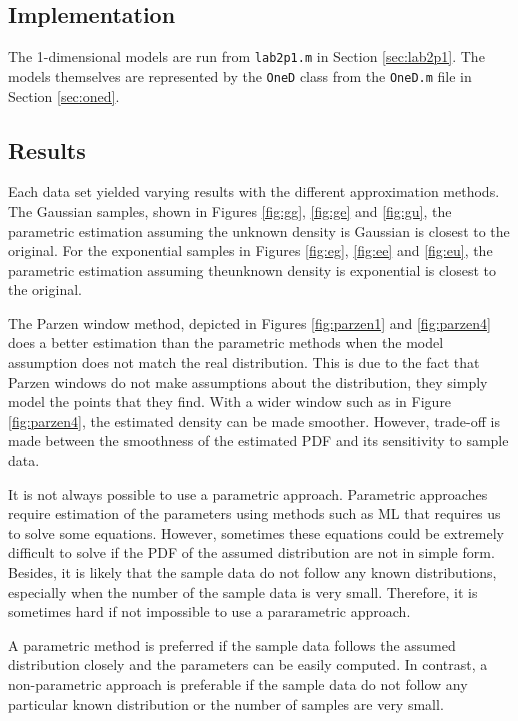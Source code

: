 \label{sec:1d}
\subsection{Implementation}
The 1-dimensional models are run from \texttt{lab2p1.m} in Section
\ref{sec:lab2p1}. The models themselves are represented by the \texttt{OneD}
class from the \texttt{OneD.m} file in Section \ref{sec:oned}.

\subsection{Results}
Each data set yielded varying results with the different approximation methods.
The Gaussian samples, shown in Figures \ref{fig:gg}, \ref{fig:ge} and
\ref{fig:gu}, the parametric estimation assuming the unknown density is
Gaussian is closest to the original. For the exponential samples in Figures
\ref{fig:eg}, \ref{fig:ee} and \ref{fig:eu}, the
parametric estimation assuming theunknown density is exponential is closest to
the original.

The Parzen window method, depicted in Figures \ref{fig:parzen1} and \ref{fig:parzen4} does a
better estimation than the parametric methods when the model assumption does
not match the real distribution. This is due to the fact that Parzen windows do
not make assumptions about the distribution, they simply model the points that
they find. With a wider window such as in Figure \ref{fig:parzen4}, the estimated density
can be made smoother. However, trade-off is made between the smoothness of the estimated PDF and its
sensitivity to sample data.

It is not always possible to use a parametric approach. Parametric
approaches require estimation of the parameters using methods such as ML that
requires us to solve some equations. However, sometimes these equations could
be extremely difficult to solve if the PDF of the assumed distribution are not
in simple form. Besides, it is likely that the sample data do not follow any
known distributions, especially when the number of the sample data is very
small. Therefore, it is sometimes hard if not impossible to use a pararametric approach.

A parametric method is preferred if the sample data follows the assumed
distribution closely and the parameters can be easily computed. In contrast, a
non-parametric approach is preferable if the sample data do not follow any
particular known distribution or the number of samples are very small.

